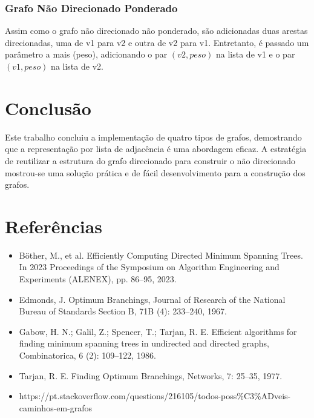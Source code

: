 \documentclass[12pt]{article}
\begin{document}
\subsubsection{Grafo Não Direcionado Ponderado}
Assim como o grafo não direcionado não ponderado, são adicionadas duas arestas 
direcionadas, uma de v1 para v2 e outra de v2 para v1. Entretanto, é passado 
um parâmetro a mais (peso), adicionando o par $(v2, peso)$ na lista de v1 e o par $(v1, peso)$ 
na lista de v2.  

\section{Conclusão}
Este trabalho concluiu a implementação de quatro tipos de grafos, demostrando que a 
representação por lista de adjacência é uma abordagem eficaz. A estratégia de reutilizar a estrutura 
do grafo direcionado para construir o não direcionado mostrou-se uma solução prática e de fácil 
desenvolvimento para a construção dos grafos.

\section*{Referências}

\begin{itemize}
    \item Böther, M., et al. Efficiently Computing Directed Minimum Spanning Trees. In 2023 Proceedings of the Symposium on Algorithm Engineering and Experiments (ALENEX), pp. 86--95, 2023.
    \item Edmonds, J. Optimum Branchings, Journal of Research of the National Bureau of Standards Section B, 71B (4): 233--240, 1967.
    \item Gabow, H. N.; Galil, Z.; Spencer, T.; Tarjan, R. E. Efficient algorithms for finding minimum spanning trees in undirected and directed graphs, Combinatorica, 6 (2): 109--122, 1986.
    \item Tarjan, R. E. Finding Optimum Branchings, Networks, 7: 25--35, 1977.
    \item https://pt.stackoverflow.com/questions/216105/todos-poss\%C3\%ADveis-caminhos-em-grafos
\end{itemize}
\end{document}
